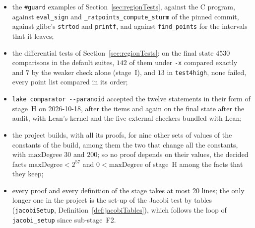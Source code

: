 \begin{itemize}
    option of the command line sets in the namespace of \verb|Ratpoints.Options|, and the guards of
    the negation and \verb|fabs| against gcc and glibc; the mirrors at the generality of Mathlib,
    each importing its sibling, the signs of polynomials over ordered normed fields; the general
    facts out of the proof files, into the files of core facts and a mirror; the invariant of the
    join a structure with named fields, hypotheses weakened and orphans deleted; the lemmas that are
    not contracts named by their statements; the idioms, among them the congruence proofs as
    quotations and the order of \verb|WithBotTop| through its mirror; and the descriptions, the
    reflow and the imports of Sturm's theorem, which no longer name the modules that the Sturm
    sequence brings;
  \item the \verb|#guard| examples of Section~\ref{sec:regionTests}, against the C program, against
    \verb|eval_sign| and \verb|_ratpoints_compute_sturm| of the pinned commit, against glibc's
    \verb|strtod| and \verb|printf|, and against \verb|find_points| for the intervals that it
    leaves;
  \item the differential tests of Section~\ref{sec:regionTests}: on the final state $4530$
    comparisons in the default suites, $142$ of them under \verb|-x| compared exactly and $7$ by
    the weaker check alone (stage~I), and $13$ in \verb|test4high|, none failed, every point list
    compared in its order;
  \item \verb|lake comparator --paranoid| accepted the twelve statements in their form of stage~H on
    2026-10-18, after the items and again on the final state after the audit, with Lean's kernel
    and the five external checkers bundled with Lean;
  \item the project builds, with all its proofs, for nine other sets of values of the constants of
    the build, among them the two that change all the constants, with $\mathrm{maxDegree}$ $30$ and
    $200$; so no proof depends on their values, the decided facts $\mathrm{maxDegree} < 2^{57}$ and
    $0 < \mathrm{maxDegree}$ of stage~H among the facts that they keep;
  \item every proof and every definition of the stage takes at most 20 lines; the only longer one in
    the project is the set-up of the Jacobi test by tables (\verb|jacobiSetup|,
    Definition~\ref{def:jacobiTables}), which follows the loop of \verb|jacobi_setup| since
    sub-stage~F2.
\end{itemize}
